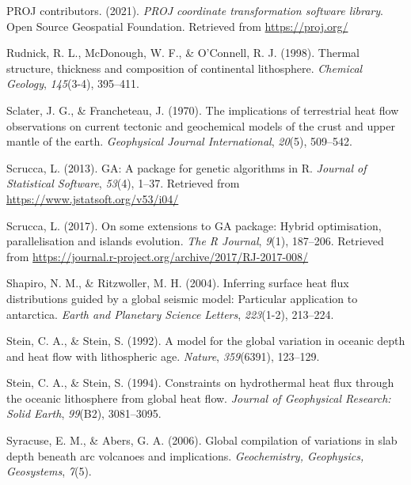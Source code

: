 \documentclass[draft,linenumbers]{agujournal2018}
\begin{document}
\leavevmode{}%
PROJ contributors. (2021). \emph{{PROJ} coordinate transformation
software library}. Open Source Geospatial Foundation. Retrieved from
\url{https://proj.org/}

\leavevmode{}%
Rudnick, R. L., McDonough, W. F., \& O'Connell, R. J. (1998). Thermal
structure, thickness and composition of continental lithosphere.
\emph{Chemical Geology}, \emph{145}(3-4), 395--411.

\leavevmode{}%
Sclater, J. G., \& Francheteau, J. (1970). The implications of
terrestrial heat flow observations on current tectonic and geochemical
models of the crust and upper mantle of the earth. \emph{Geophysical
Journal International}, \emph{20}(5), 509--542.

\leavevmode{}%
Scrucca, L. (2013). {GA}: A package for genetic algorithms in {R}.
\emph{Journal of Statistical Software}, \emph{53}(4), 1--37. Retrieved
from \url{https://www.jstatsoft.org/v53/i04/}

\leavevmode{}%
Scrucca, L. (2017). On some extensions to {GA} package: Hybrid
optimisation, parallelisation and islands evolution. \emph{The R
Journal}, \emph{9}(1), 187--206. Retrieved from
\url{https://journal.r-project.org/archive/2017/RJ-2017-008/}

\leavevmode{}%
Shapiro, N. M., \& Ritzwoller, M. H. (2004). Inferring surface heat flux
distributions guided by a global seismic model: Particular application
to antarctica. \emph{Earth and Planetary Science Letters},
\emph{223}(1-2), 213--224.

\leavevmode{}%
Stein, C. A., \& Stein, S. (1992). A model for the global variation in
oceanic depth and heat flow with lithospheric age. \emph{Nature},
\emph{359}(6391), 123--129.

\leavevmode{}%
Stein, C. A., \& Stein, S. (1994). Constraints on hydrothermal heat flux
through the oceanic lithosphere from global heat flow. \emph{Journal of
Geophysical Research: Solid Earth}, \emph{99}(B2), 3081--3095.

\leavevmode{}%
Syracuse, E. M., \& Abers, G. A. (2006). Global compilation of
variations in slab depth beneath arc volcanoes and implications.
\emph{Geochemistry, Geophysics, Geosystems}, \emph{7}(5).
\end{document}
